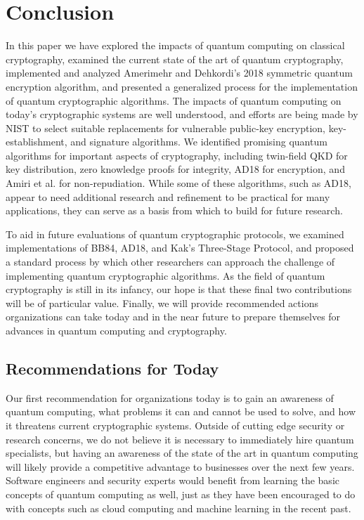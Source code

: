 \documentclass[sigconf]{acmart}
\begin{document}
\section{Conclusion}
In this paper we have explored the impacts of quantum computing on classical cryptography, examined the current state of the art of quantum cryptography, implemented and analyzed Amerimehr and Dehkordi's 2018 symmetric quantum encryption algorithm\cite{amerimehr_quantum_2018}, and presented a generalized process for the implementation of quantum cryptographic algorithms. The impacts of quantum computing on today's cryptographic systems are well understood, and efforts are being made by NIST to select suitable replacements for vulnerable public-key encryption, key-establishment, and signature algorithms\cite{moody_nist_2020, csd_postquantum_2017}. We identified promising quantum algorithms for important aspects of cryptography, including twin-field QKD for key distribution, zero knowledge proofs for integrity, AD18 for encryption, and Amiri et al.\cite{amiri_secure_2016} for non-repudiation. While some of these algorithms, such as AD18, appear to need additional research and refinement to be practical for many applications, they can serve as a basis from which to build for future research.

To aid in future evaluations of quantum cryptographic protocols, we examined implementations of BB84, AD18, and Kak's Three-Stage Protocol, and proposed a standard process by which other researchers can approach the challenge of implementing quantum cryptographic algorithms. As the field of quantum cryptography is still in its infancy, our hope is that these final two contributions will be of particular value. Finally, we will provide recommended actions organizations can take today and in the near future to prepare themselves for advances in quantum computing and cryptography.

\subsection{Recommendations for Today}
Our first recommendation for organizations today is to gain an awareness of quantum computing, what problems it can and cannot be used to solve, and how it threatens current cryptographic systems. Outside of cutting edge security or research concerns, we do not believe it is necessary to immediately hire quantum specialists, but having an awareness of the state of the art in quantum computing will likely provide a competitive advantage to businesses over the next few years. Software engineers and security experts would benefit from learning the basic concepts of quantum computing as well, just as they have been encouraged to do with concepts such as cloud computing and machine learning in the recent past.
\end{document}
